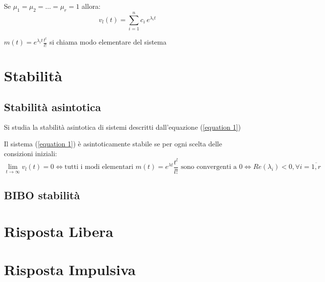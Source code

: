 \begin{osservazione}
	Se $\mu_1 = \mu_2 = \dots = \mu_r = 1$ allora:
	\begin{equation*}
		v_l(t)=  \sum_{i=1}^{n}c_{i} \,e^{\lambda_it}
	\end{equation*}
\end{osservazione}

\begin{definizione}
	$m(t) = e^{\lambda_i t} \frac{t^l}{l!} $ si chiama modo elementare del sistema
\end{definizione}


\section{Stabilità}
\subsection{Stabilità asintotica}
Si studia la stabilità asintotica di sistemi descritti dall'equazione (\ref{equation 1})

\begin{theorem}
	Il sistema (\ref{equation 1}) è asintoticamente stabile se per ogni scelta delle consizioni iniziali:
	\begin{equation*}
		\lim_{t \to \infty}v_l(t)=0
		\Leftrightarrow\text{tutti i modi elementari } m(t)=e^{\lambda t}\frac{t^l}{l!}\text{ sono convergenti a $0$}
		\Leftrightarrow Re(\lambda_i)<0,\forall i = \overline{1,r}
	\end{equation*}
\end{theorem}


\subsection{BIBO stabilità}


\section{Risposta Libera}



\section{Risposta Impulsiva}

